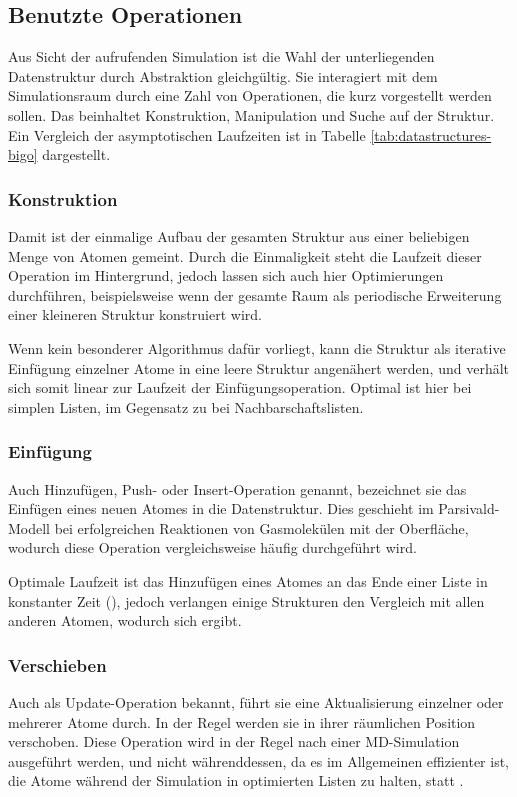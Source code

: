 \subsection{Benutzte Operationen}


Aus Sicht der aufrufenden Simulation ist die Wahl der unterliegenden Datenstruktur durch Abstraktion gleichgültig.
Sie interagiert mit dem Simulationsraum durch eine Zahl von Operationen, die kurz vorgestellt werden sollen.
Das beinhaltet Konstruktion, Manipulation und Suche auf der Struktur.
Ein Vergleich der asymptotischen Laufzeiten ist in Tabelle \ref{tab:datastructures-bigo} dargestellt.

\subsubsection{Konstruktion}
Damit ist der einmalige Aufbau der gesamten Struktur aus einer beliebigen Menge von Atomen gemeint.
Durch die Einmaligkeit steht die Laufzeit dieser Operation im Hintergrund, jedoch lassen sich auch hier Optimierungen durchführen, beispielsweise wenn der gesamte Raum als periodische Erweiterung einer kleineren Struktur konstruiert wird.

Wenn kein besonderer Algorithmus dafür vorliegt, kann die Struktur als iterative Einfügung einzelner Atome in eine leere Struktur angenähert werden, und verhält sich somit linear zur Laufzeit der Einfügungsoperation.
Optimal ist hier  bei simplen Listen, im Gegensatz zu  bei Nachbarschaftslisten.

\subsubsection{Einfügung}
Auch Hinzufügen, Push- oder Insert-Operation genannt, bezeichnet sie das Einfügen eines neuen Atomes in die Datenstruktur.
Dies geschieht im Parsivald-Modell bei erfolgreichen Reaktionen von Gasmolekülen mit der Oberfläche, wodurch diese Operation vergleichsweise häufig durchgeführt wird.

Optimale Laufzeit ist das Hinzufügen eines Atomes an das Ende einer Liste in konstanter Zeit (), jedoch verlangen einige Strukturen den Vergleich mit allen anderen Atomen, wodurch sich  ergibt.

\subsubsection{Verschieben}
Auch als Up\-date-Operation bekannt, führt sie eine Aktualisierung einzelner oder mehrerer Atome durch.
In der Regel werden sie in ihrer räumlichen Position verschoben.
Diese Operation wird in der Regel nach einer MD-Simulation ausgeführt werden, und nicht währenddessen, da es im Allgemeinen effizienter ist, die Atome während der Simulation in optimierten Listen zu halten, statt .

